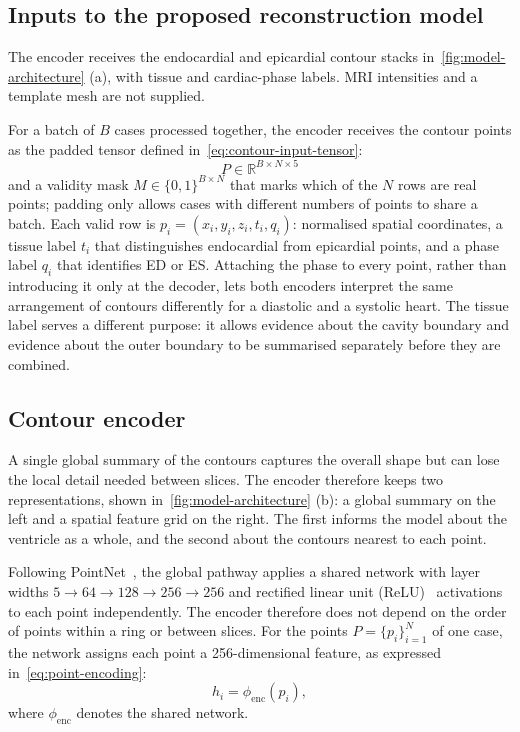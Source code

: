 \FloatBarrier
\subsection{Inputs to the proposed reconstruction model}
\label{subsec:architecture-input}
\noindent
The encoder receives the endocardial and epicardial contour stacks
in~\cref{fig:model-architecture} (a), with tissue and cardiac-phase labels.
MRI intensities and a template mesh are not supplied.

For a batch of $B$ cases processed together, the encoder receives the contour
points as the padded tensor defined in~\cref{eq:contour-input-tensor}:
\begin{equation}
	P \in \mathbb{R}^{B\times N\times5}
	\label{eq:contour-input-tensor}
\end{equation}
and a validity mask $M\in\{0,1\}^{B\times N}$ that marks which of the $N$ rows
are real points; padding only allows cases with different numbers of points to
share a batch. Each valid row is $p_i=(x_i,y_i,z_i,t_i,q_i)$: normalised
spatial coordinates, a tissue label $t_i$ that distinguishes endocardial from
epicardial points, and a phase label $q_i$ that identifies ED or ES. Attaching
the phase to every point, rather than introducing it only at the decoder, lets both
encoders interpret the same arrangement of contours differently for a
diastolic and a systolic heart. The tissue label serves a different purpose: it
allows evidence about the cavity boundary and evidence about the outer boundary
to be summarised separately before they are combined.

\subsection{Contour encoder}
\label{subsec:contour-encoder}
\noindent
A single global summary of the contours captures the overall shape but can
lose the local detail needed between slices. The encoder therefore keeps two
representations, shown in~\cref{fig:model-architecture} (b): a global summary
on the left and a spatial feature grid on the right. The first informs the
model about the ventricle as a whole, and the second
about the contours nearest to each point.

Following PointNet~\parencite{qi2017pointnet}, the global pathway applies a
shared network with layer widths
$5\rightarrow64\rightarrow128\rightarrow256\rightarrow256$ and rectified linear unit (ReLU)~\parencite{nair2010relu}
activations to each point independently. The encoder therefore does not
depend on the order of points within a ring or between slices. For the points
$P = \{p_i\}_{i=1}^{N}$ of one case, the network assigns each point a
256-dimensional feature, as expressed in~\cref{eq:point-encoding}:
\begin{equation}
	h_i = \phi_{\mathrm{enc}}(p_i),
	\label{eq:point-encoding}
\end{equation}
where $\phi_{\mathrm{enc}}$ denotes the shared network.

